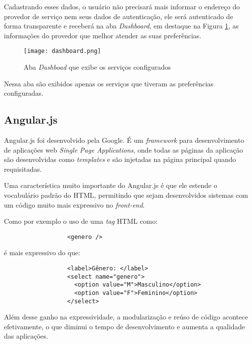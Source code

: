 Cadastrando esses dados, o usuário não precisará mais informar o endereço do provedor de serviço nem seus dados de autenticação, ele será autenticado de forma transparente e receberá na aba \textit{Dashboard}, em destaque na Figura \ref{fig:dashboard}, as informações do provedor que melhor atender as suas preferências.

\begin{figure}[!htb]
  \centering
  \texttt{[image: dashboard.png]} %
  \caption[Aba \textit{Dashboad} que exibe os serviços configurados]{Aba \textit{Dashboad} que exibe os serviços configurados}
  \label{fig:dashboard}
\end{figure}

Nessa aba são exibidos apenas os serviços que tiveram as preferências configuradas.

\subsection{Angular.js}
Angular.js foi desenvolvido pela Google. É um \textit{framework} para desenvolvimento de aplicações web \textit{Single Page Applications}, onde todas as páginas da aplicação são desenvolvidas como \textit{templates} e são injetadas na página principal quando requisitadas.

Uma característica muito importante do Angular.js é que ele estende o vocabulário padrão do HTML, permitindo que sejam desenvolvidos sistemas com um código muito mais expressivo no \textit{front-end}.

Como por exemplo o uso de uma \textit{tag} HTML como: 
\begin{footnotesize}
  \begin{verbatim}
                  <genero />
  \end{verbatim}
\end{footnotesize}

é mais expressivo do que:

\begin{footnotesize}
  \begin{verbatim}
                  <label>Gênero: </label>
                  <select name="genero">
                    <option value="M">Masculino</option>
                    <option value="F">Feminino</option>
                  </select>
  \end{verbatim}
\end{footnotesize}

Além desse ganho na expressividade, a modularização e reúso de código acontece efetivamente, o que diminui o tempo de desenvolvimento e aumenta a qualidade das aplicações.


